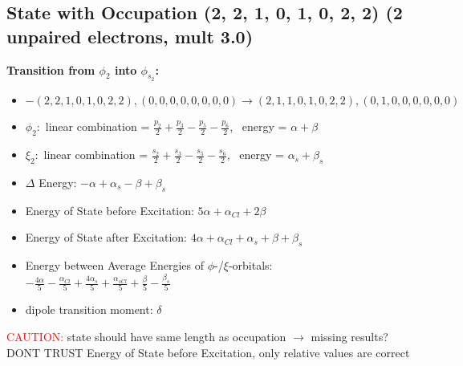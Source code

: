 \documentclass[12pt,a4paper]{article}
\begin{document}
\subsection*{State with Occupation (2, 2, 1, 0, 1, 0, 2, 2) (2 unpaired electrons, mult 3.0)}
        \noindent\textbf{Transition from $\phi_{2}$ into $\phi_{s_{2}}$:}
        \begin{itemize}
            \item $- (2, 2, 1, 0, 1, 0, 2, 2), (0, 0, 0, 0, 0, 0, 0, 0) \rightarrow (2, 1, 1, 0, 1, 0, 2, 2), (0, 1, 0, 0, 0, 0, 0, 0)$
        
            \item $\phi_{2}:$ linear combination = $\frac{p_{2}}{2} + \frac{p_{3}}{2} - \frac{p_{5}}{2} - \frac{p_{6}}{2}$, \
            energy = $\alpha + \beta$
            
            \item $\xi_{2}:$ linear combination = $\frac{s_{2}}{2} + \frac{s_{3}}{2} - \frac{s_{5}}{2} - \frac{s_{6}}{2}$, \
            energy = $\alpha_{s} + \beta_{s}$
            
            \item $\Delta$ Energy: $- \alpha + \alpha_{s} - \beta + \beta_{s}$
            \item Energy of State before Excitation: $5 \alpha + \alpha_{Cl} + 2 \beta$
            \item Energy of State after Excitation: $4 \alpha + \alpha_{Cl} + \alpha_{s} + \beta + \beta_{s}$
            \item Energy between Average Energies of $\phi$-/$\xi$-orbitals: \
            $- \frac{4 \alpha}{5} - \frac{\alpha_{Cl}}{5} + \frac{4 \alpha_{s}}{5} + \frac{\alpha_{s Cl}}{5} + \frac{\beta}{5} - \frac{\beta_{s}}{5}$
        
            \item dipole transition moment: $\delta$
        
        \end{itemize}
        
	\textcolor{red}{CAUTION:} state should have same length as occupation $\rightarrow$ missing results?
	DONT TRUST \glqq{}Energy of State before Excitation\grqq{}, only relative values are correct
\end{document}
